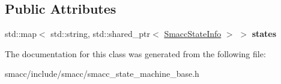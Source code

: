 \subsection*{Public Attributes}
\begin{DoxyCompactItemize}
\item 
\mbox{\label{classsmacc_1_1SmaccStateMachineInfo_ab5d31ae049139eddad79708a885d1c25}} 
std\+::map$<$ std\+::string, std\+::shared\+\_\+ptr$<$ \hyperlink{classsmacc_1_1SmaccStateInfo}{Smacc\+State\+Info} $>$ $>$ {\bfseries states}
\end{DoxyCompactItemize}


The documentation for this class was generated from the following file\+:\begin{DoxyCompactItemize}
\item 
smacc/include/smacc/smacc\+\_\+state\+\_\+machine\+\_\+base.\+h\end{DoxyCompactItemize}
